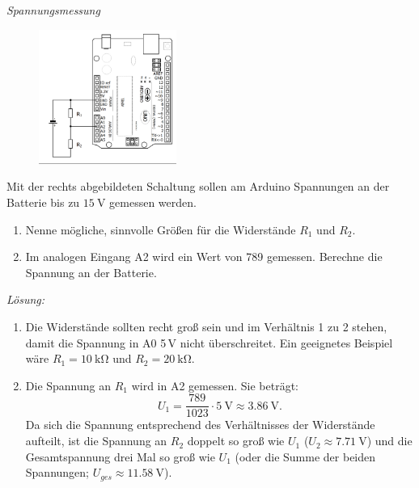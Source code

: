 \documentclass[ngerman, 11pt]{scrreprt}
\begin{document}
	\newpage
	\begin{aufgabe} \emph{Spannungsmessung}
		
		\begin{figure}
			\centering
			\vspace{-2\baselineskip}
			\includegraphics[width=0.4\textwidth]{../Zeichnungen/schaltplan-spannungsmessung.png}
		\end{figure}
		Mit der rechts abgebildeten Schaltung sollen am Arduino Spannungen an der Batterie bis zu $\SI{15}{\volt}$ gemessen werden.
		\begin{enumerate}[label=\alph*),itemsep=0mm,parsep=0mm]
			\item Nenne mögliche, sinnvolle Größen für die Widerstände $R_1$ und $R_2$.
			\item Im analogen Eingang A2 wird ein Wert von 789 gemessen. Berechne die Spannung an der Batterie.
		\end{enumerate}
	\end{aufgabe}
	
	\bigskip
	\emph{Lösung:}
	\begin{enumerate}[label=\alph*),itemsep=0mm,parsep=0mm]
		\item Die Widerstände sollten recht groß sein und im Verhältnis 1 zu 2 stehen, damit die Spannung in A0 5\,V nicht überschreitet. Ein geeignetes Beispiel wäre $R_1=\SI{10}{\kilo\ohm}$ und $R_2=\SI{20}{\kilo\ohm}$.
		\item Die Spannung an $R_1$ wird in A2 gemessen. Sie beträgt:
		\begin{equation*}
			U_1=\frac{789}{1023}\cdot \SI{5}{\volt} \approx \SI{3,86}{\volt}.
		\end{equation*}
		Da sich die Spannung entsprechend des Verhältnisses der Widerstände aufteilt, ist die Spannung an $R_2$ doppelt so groß wie $U_1$ ($U_2\approx \SI{7,71}{\volt}$) und die Gesamtspannung drei Mal so groß wie $U_1$ (oder die Summe der beiden Spannungen; $U_{ges}\approx \SI{11,58}{\volt}$).
	\end{enumerate}
	
\end{document}
